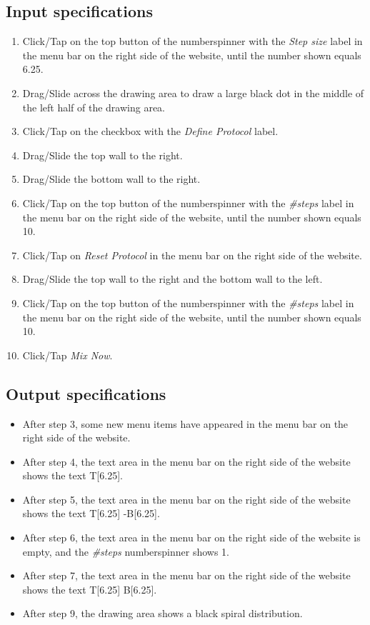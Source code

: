 \subsection*{Input specifications}
\begin{enumerate}
\item Click/Tap on the top button of the numberspinner with the \emph{Step size} label in the menu bar on the right side of the website, until the number shown equals 6.25.
\item Drag/Slide across the drawing area to draw a large black dot in the middle of the left half of the drawing area.
\item Click/Tap on the checkbox with the \emph{Define Protocol} label.
\item Drag/Slide the top wall to the right.
\item Drag/Slide the bottom wall to the right.
\item Click/Tap on the top button of the numberspinner with the \emph{\#steps} label in the menu bar on the right side of the website, until the number shown equals 10.
\item Click/Tap on \emph{Reset Protocol} in the menu bar on the right side of the website.
\item Drag/Slide the top wall to the right and the bottom wall to the left.
\item Click/Tap on the top button of the numberspinner with the \emph{\#steps} label in the menu bar on the right side of the website, until the number shown equals 10.
\item Click/Tap \emph{Mix Now}.
\end{enumerate}

\subsection*{Output specifications}
\begin{itemize}
\item After step 3, some new menu items have appeared in the menu bar on the right side of the website.
\item After step 4, the text area in the menu bar on the right side of the website shows the text T[6.25].
\item After step 5, the text area in the menu bar on the right side of the website shows the text T[6.25] -B[6.25].
\item After step 6, the text area in the menu bar on the right side of the website is empty, and the \emph{\#steps} numberspinner shows 1.
\item After step 7, the text area in the menu bar on the right side of the website shows the text T[6.25] B[6.25].
\item After step 9, the drawing area shows a black spiral distribution.
\end{itemize}

